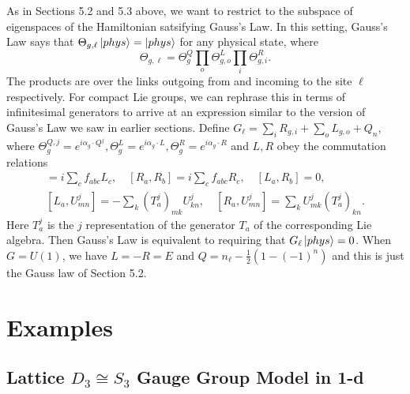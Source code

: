 \documentclass[10pt,reqno]{amsart}
\numberwithin{equation}{section}
\begin{document}
	As in Sections 5.2 and 5.3 above, we want to restrict to the subspace of eigenspaces of the Hamiltonian satsifying Gauss's Law.
	In this setting, Gauss's Law says that $\Theta_{g,\ell} \ket{phys} = \ket{phys}$ for any physical state, where
	\begin{equation}
		\Theta_{g,\ell}=\Theta^Q_g\prod_{o} \Theta^L_{g,o} \prod_{i}\Theta^R_{g,i}.
	\end{equation}
	The products are over the links outgoing from and incoming to the site $\ell$ respectively.
	For compact Lie groups, we can rephrase this in terms of infinitesimal generators to arrive at an expression similar to the version of Gauss's Law we saw in earlier sections.
	Define $G_\ell = \sum_{i}R_{g,i}+\sum_{o} L_{g,o} + Q_n$, where
	$\Theta_g^{Q,j}=e^{i\alpha_g \cdot Q^j}, \Theta^L_{g}=e^{i\alpha_g \cdot L}, \Theta^R_g=e^{i\alpha_g \cdot R}$ and $L,R$ obey the commutation relations 
	\begin{align}
		[L_a,L_b]=i\sum_{c}f_{abc}L_c, \quad [R_a,R_b]=i\sum_{c}f_{abc}R_c, \quad [L_a,R_b]=0, \\
		[L_a,U^j_{mn}]=-\sum_{k}(T^j_a)_{mk} U^j_{kn}, \quad [R_a,U^j_{mn}]=\sum_{k}U^j_{mk}(T^j_a)_{kn} . 
	\end{align}
	Here $T^j_a$ is the $j$ representation of the generator $T_a$ of the corresponding Lie algebra.
	Then Gauss's Law is equivalent to requiring that $G_\ell \ket{phys}=0$.
	When $G=U(1)$, we have $L=-R=E$ and $Q=n_\ell - \frac{1}{2}(1-(-1)^n)$ and this is just the Gauss law of Section 5.2.
	
	
	\section{Examples}
	
	\subsection{Lattice $D_3\cong S_3$ Gauge Group Model in 1-d}	
	
\end{document}
